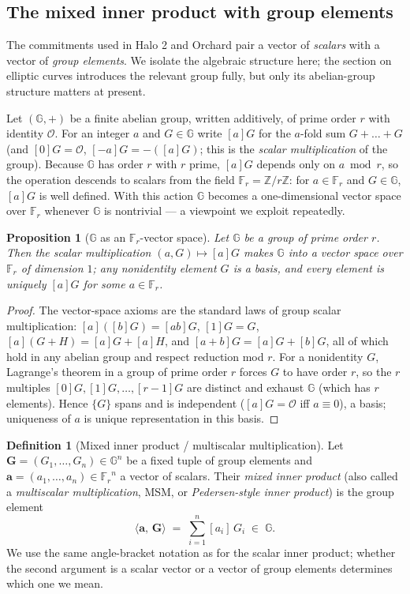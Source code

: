 \documentclass[11pt,a4paper]{article}
\newtheorem{proposition}[theorem]{Proposition}
\theoremstyle{definition}
\newtheorem{definition}[theorem]{Definition}
\theoremstyle{remark}
\newcommand{\Z}{\ensuremath{\mathbb{Z}}}
\newcommand{\G}{\ensuremath{\mathbb{G}}}
\newcommand{\ip}[2]{\langle #1,\, #2 \rangle}
\newcommand{\Fr}{\ensuremath{\mathbb{F}_{r}}}
\begin{document}
\subsection{The mixed inner product with group elements}\label{linalg:subsec-mixed}

The commitments used in Halo 2 and Orchard pair a vector of \emph{scalars} with a vector of \emph{group elements}. We isolate the algebraic structure here; the section on elliptic curves introduces the relevant group fully, but only its abelian-group structure matters at present.

Let \((\G, +)\) be a finite abelian group, written additively, of prime order \(r\) with identity \(\mathcal O\). For an integer \(a\) and \(G \in \G\) write \([a]G\) for the \(a\)-fold sum \(G + \dots + G\) (and \([0]G = \mathcal O\), \([-a]G = -([a]G)\); this is the \emph{scalar multiplication} of the group). Because \(\G\) has order \(r\) with \(r\) prime, \([a]G\) depends only on \(a \bmod r\), so the operation descends to scalars from the field \(\Fr = \Z/r\Z\): for \(a \in \Fr\) and \(G \in \G\), \([a]G\) is well defined. With this action \(\G\) becomes a one-dimensional vector space over \(\Fr\) whenever \(\G\) is nontrivial — a viewpoint we exploit repeatedly.

\begin{proposition}[\(\G\) as an \(\Fr\)-vector space]\label{linalg:prop-G-vs}
Let \(\G\) be a group of prime order \(r\). Then the scalar multiplication \((a, G) \mapsto [a]G\) makes \(\G\) into a vector space over \(\Fr\) of dimension \(1\); any nonidentity element \(G\) is a basis, and every element is uniquely \([a]G\) for some \(a \in \Fr\).
\end{proposition}

\begin{proof}
The vector-space axioms are the standard laws of group scalar multiplication: \([a]([b]G) = [ab]G\), \([1]G = G\), \([a](G+H) = [a]G + [a]H\), and \([a+b]G = [a]G + [b]G\), all of which hold in any abelian group and respect reduction mod \(r\). For a nonidentity \(G\), Lagrange's theorem in a group of prime order \(r\) forces \(G\) to have order \(r\), so the \(r\) multiples \([0]G, [1]G, \dots, [r-1]G\) are distinct and exhaust \(\G\) (which has \(r\) elements). Hence \(\{G\}\) spans and is independent (\([a]G = \mathcal O\) iff \(a \equiv 0\)), a basis; uniqueness of \(a\) is unique representation in this basis.
\end{proof}

\begin{definition}[Mixed inner product / multiscalar multiplication]\label{linalg:def-msm}
Let \(\mathbf G = (G_1, \dots, G_n) \in \G^n\) be a fixed tuple of group elements and \(\mathbf a = (a_1, \dots, a_n) \in \Fr^n\) a vector of scalars. Their \emph{mixed inner product} (also called a \emph{multiscalar multiplication}, MSM, or \emph{Pedersen-style inner product}) is the group element
\[
\ip{\mathbf a}{\mathbf G} \;=\; \sum_{i=1}^n [a_i]\,G_i \;\in\; \G .
\]
We use the same angle-bracket notation as for the scalar inner product; whether the second argument is a scalar vector or a vector of group elements determines which one we mean.
\end{definition}
\end{document}
